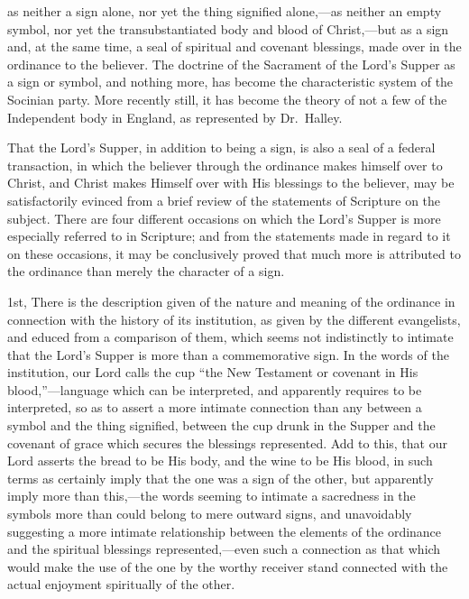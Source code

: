 \documentclass[]{book}
\begin{document}
as neither a sign alone, nor yet the thing signified alone,---as neither an empty symbol, nor yet the transubstantiated body and blood of Christ,---but as a sign and, at the same time, a seal of spiritual and covenant blessings, made over in the ordinance to the believer. The doctrine of the Sacrament of the Lord's Supper as a sign or symbol, and nothing more, has become the characteristic system of the Socinian party. More recently still, it has become the theory of not a few of the Independent body in England, as represented by Dr.~Halley.

That the Lord's Supper, in addition to being a sign, is also a seal of a federal transaction, in which the believer through the ordinance makes himself over to Christ, and Christ makes Himself over with His blessings to the believer, may be satisfactorily evinced from a brief review of the statements of Scripture on the subject. There are four different occasions on which the Lord's Supper is more especially referred to in Scripture; and from the statements made in regard to it on these occasions, it may be conclusively proved that much more is attributed to the ordinance than merely the character of a sign.

1st, There is the description given of the nature and meaning of the ordinance in connection with the history of its institution, as given by the different evangelists, and educed from a comparison of them, which seems not indistinctly to intimate that the Lord's Supper is more than a commemorative sign. In the words of the institution, our Lord calls the cup ``the New Testament or covenant in His blood,''---language which can be interpreted, and apparently requires to be interpreted, so as to assert a more intimate connection than any between a symbol and the thing signified, between the cup drunk in the Supper and the covenant of grace which secures the blessings represented. Add to this, that our Lord asserts the bread to be His body, and the wine to be His blood, in such terms as certainly imply that the one was a sign of the other, but apparently imply more than this,---the words seeming to intimate a sacredness in the symbols more than could belong to mere outward signs, and unavoidably suggesting a more intimate relationship between the elements of the ordinance and the spiritual blessings represented,---even such a connection as that which would make the use of the one by the worthy receiver stand connected with the actual enjoyment spiritually of the other.
\end{document}
